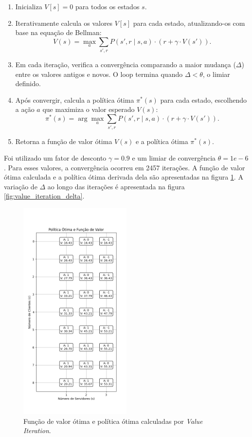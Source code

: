 \begin{enumerate}
    \item Inicializa \( V[s] = 0 \) para todos os estados \( s \).
    \item Iterativamente calcula os valores \( V[s] \) para cada estado, atualizando-os com base na equação de Bellman:
    \[
    V(s) = \max_a \sum_{s', r} P(s', r \mid s, a) \cdot \left( r + \gamma \cdot V(s') \right).
    \]
    \item Em cada iteração, verifica a convergência comparando a maior mudança (\( \Delta \)) entre os valores antigos e novos. O loop termina quando \( \Delta < \theta \), o limiar definido.
    \item Após convergir, calcula a política ótima \( \pi^*(s) \) para cada estado, escolhendo a ação \( a \) que maximiza o valor esperado \( V(s) \):
    \[
    \pi^*(s) = \arg\max_a \sum_{s', r} P(s', r \mid s, a) \cdot \left( r + \gamma \cdot V(s') \right).
    \]
    \item Retorna a função de valor ótima \( V(s) \) e a política ótima \( \pi^*(s) \).
\end{enumerate}

Foi utilizado um fator de desconto $\gamma = 0.9$ e um limiar de convergência $\theta = 1e-6$. Para esses valores, a convergência ocorreu em 2457 iterações. A função de valor ótima calculada e a política ótima derivada dela são apresentadas na figura \ref{fig:value_iteration_policy_and_values}.
A variação de $\Delta$ ao longo das iterações é apresentada na figura \ref{fig:value_iteration_delta}.

\begin{figure}[H]
    \centering
    \includegraphics[width=0.5\textwidth]{fig/value_iteration_policy_and_values.png}
    \caption{Função de valor ótima e política ótima calculadas por \textit{Value Iteration}.}
    \label{fig:value_iteration_policy_and_values}
\end{figure}

